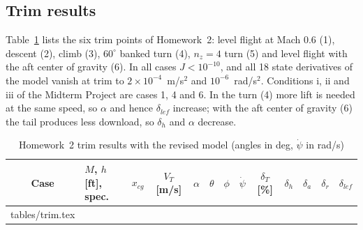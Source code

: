 \documentclass[conf]{new-aiaa}
\makeatletter
\newcommand\tabinput[1]{\@@input #1 }
\makeatother
\begin{document}
\subsection{Trim results}
Table~\ref{tab:trim} lists the six trim points of Homework~2: level flight at Mach 0.6 (1), descent (2), climb (3), $60^\circ$ banked turn (4), $n_z=4$ turn (5) and level flight with the aft center of gravity (6). In all cases $J<10^{-10}$, and all 18 state derivatives of the model vanish at trim to $2\times10^{-4}$~m/s$^2$ and $10^{-6}$~rad/s$^2$. Conditions i, ii and iii of the Midterm Project are cases 1, 4 and 6. In the turn (4) more lift is needed at the same speed, so $\alpha$ and hence $\delta_{lef}$ increase; with the aft center of gravity (6) the tail produces less download, so $\delta_h$ and $\alpha$ decrease.

\begin{table}[hbt!]
\caption{\label{tab:trim} Homework~2 trim results with the revised model (angles in deg, $\dot\psi$ in rad/s)}
\centering
\small
\setlength\tabcolsep{3.5pt}
\begin{tabular}{clccccccccccc}
\toprule
Case & $M$, $h$ [ft], spec. & $x_{cg}$ & $V_T$ [m/s] & $\alpha$ & $\theta$ & $\phi$ & $\dot\psi$ & $\delta_T$ [\%] & $\delta_h$ & $\delta_a$ & $\delta_r$ & $\delta_{lef}$ \\
\midrule
\tabinput{tables/trim.tex}
\bottomrule
\end{tabular}
\end{table}
\end{document}
